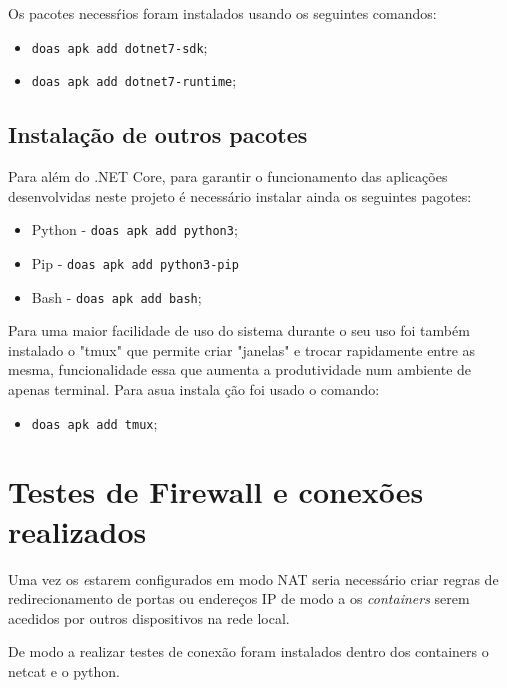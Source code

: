 Os pacotes necessŕios foram instalados usando os seguintes comandos:
\begin{itemize}
    \item \texttt{doas apk add dotnet7-sdk};
    \item \texttt{doas apk add dotnet7-runtime};
\end{itemize}




\subsection{Instalação de outros pacotes}

Para além do .NET Core, para garantir o funcionamento das aplicações desenvolvidas neste projeto é necessário
instalar ainda os seguintes pagotes:
\begin{itemize}
    \item Python - \texttt{doas apk add python3};
    \item Pip - \texttt{doas apk add python3-pip}
    \item Bash - \texttt{doas apk add bash};
\end{itemize}


Para uma maior facilidade de uso do sistema durante o seu uso foi também instalado
o "tmux" que permite criar "janelas" e trocar rapidamente entre as mesma, funcionalidade
essa que aumenta a produtividade num ambiente de apenas terminal.
Para asua instala ção foi usado o comando:
\begin{itemize}
    \item \texttt{doas apk add tmux};
\end{itemize}









\section{Testes de Firewall e conexões realizados}

Uma vez os \textit estarem configurados em modo NAT seria necessário criar regras 
de redirecionamento de portas ou endereços IP de modo a os \textit{containers} serem acedidos
por outros dispositivos na rede local.


De modo a realizar testes de conexão foram instalados dentro dos containers
o netcat e o python.


